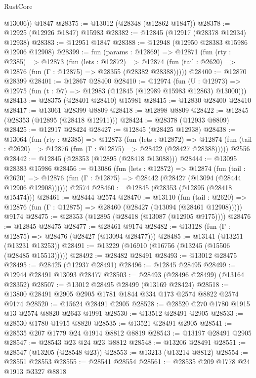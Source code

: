 \begin{lexlean}{RustCore}
\begin{coremodule}
        @13006))
    @1847
@28375 := @13012 (@28348 (@12862 @1847))
@28378 := @12925 (@12926 @1847) @15983
@28382 := @12845 (@12917 (@28378 @12934) @12938)
@28383 := @12951 @1847
@28388 := @12948 (@12950 @28383 @15986 @12906 @12908)
@28399 := fun (params : @12869) =>
  @12871
    (fun (rty : @2385) =>
    @12873
      (fun (lets : @12872) =>
      @12874 (fun (tail : @2620) => @12876 (fun (Γ : @12875) => @28355 (@28382 @28388)))))
@28400 := @12870 @28399
@28401 := @12867 @28400
@28410 := @12974
    (fun (U : @12973) => @12975 (fun (t : @7) => @12983 (@12845 (@12989 @15983 @12863) @13000)))
@28413 := @28375 (@28401 @28410) @15981
@28415 := @12830 @28400 @28410
@28417 := @13061 @28399 @8809
@28418 := @12898 @8809
@28422 := @12845 (@28353 (@12895 (@28418 @12911)))
@28424 := @28378 (@12933 @8809)
@28425 := @12917 @28424
@28427 := @12845 (@28425 @12938)
@28438 := @13064
    (fun (rty : @2385) =>
    @12873
      (fun (lets : @12872) =>
      @12874 (fun (tail : @2620) => @12876 (fun (Γ : @12875) => @28422 (@28427 @28388)))))
    @2556
@28442 := @12845 (@28353 (@12895 (@28418 @13088)))
@28444 := @13095 @28383 @15986
@28456 := @13086
    (fun (lets : @12872) =>
    @12874
      (fun (tail : @2620) =>
      @12876 (fun (Γ : @12875) => @28442 (@28427 (@13094 (@28444 @12906 @12908))))))
    @2574
@28460 := @12845 (@28353 (@12895 (@28418 @15474)))
@28461 := @28444 @2574
@28470 := @13110
    (fun (tail : @2620) => @12876 (fun (Γ : @12875) => @28460 (@28427 (@13094 (@28461 @12908)))))
    @9174
@28475 := @28353 (@12895 (@28418 (@13087 (@12905 @9175))))
@28476 := @12845 @28475
@28477 := @28461 @9174
@28482 := @13128 (fun (Γ : @12875) => @28476 (@28427 (@13094 @28477)))
@28485 := @13141 (@13251 (@13231 @13253))
@28491 := @13229 (@16910 (@16756 (@13245 (@15506 (@28485 @15513)))))
@28492 := @28482 @28491
@28493 := @13012 @28475
@28495 := @28425 (@12937 @28491)
@28496 := @12845 @28495
@28499 := @12944 @28491 @13093 @28477
@28503 := @28493 (@28496 @28499) (@13164 @28352)
@28507 := @13012 @28495 @28499 (@13169 @28424)
@28518 := @13800 @28491 @2905 @2905 @1781 @1844 @334 @173 @2574 @8822 @2574 @9174
@28520 := @15624 @28491 @2905
@28528 := @28520 @270 @1780 @1915 @13 @2574 @8820 @2643 @1991
@28530 := @13512 @28491 @2905
@28533 := @28530 @1780 @1915 @8820
@28535 := @13521 @28491 @2905
@28541 := @28535 @207 @1779 @24 @1914 @8812 @8819
@28543 := @13197 @28491 @2905
@28547 := @28543 @23 @24 @23 @8812
@28548 := @13206 @28491
@28551 := @28547 (@13205 (@28548 @23))
@28553 := @13213 (@13214 @8812)
@28554 := @28551 @28553
@28555 := @28541 @28554
@28561 := @28535 @209 @1778 @24 @1913 @3327 @8818

\end{coremodule}
\end{lexlean}
